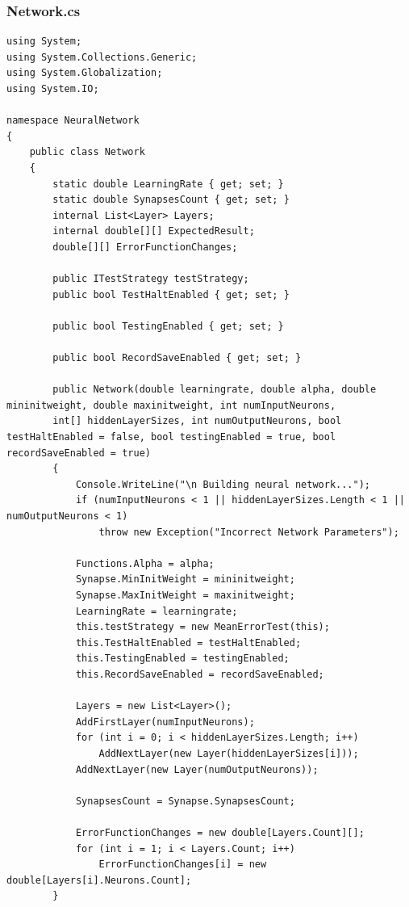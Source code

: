 \documentclass[12pt,a4paper]{article}
\begin{document}
\subsubsection*{Network.cs}
\begin{lstlisting}
using System;
using System.Collections.Generic;
using System.Globalization;
using System.IO;

namespace NeuralNetwork
{
    public class Network
    {
        static double LearningRate { get; set; }
        static double SynapsesCount { get; set; }
        internal List<Layer> Layers;
        internal double[][] ExpectedResult;
        double[][] ErrorFunctionChanges;

        public ITestStrategy testStrategy;
        public bool TestHaltEnabled { get; set; }

        public bool TestingEnabled { get; set; }

        public bool RecordSaveEnabled { get; set; }

        public Network(double learningrate, double alpha, double mininitweight, double maxinitweight, int numInputNeurons,
        int[] hiddenLayerSizes, int numOutputNeurons, bool testHaltEnabled = false, bool testingEnabled = true, bool recordSaveEnabled = true)
        {
            Console.WriteLine("\n Building neural network...");
            if (numInputNeurons < 1 || hiddenLayerSizes.Length < 1 || numOutputNeurons < 1)
                throw new Exception("Incorrect Network Parameters");

            Functions.Alpha = alpha;
            Synapse.MinInitWeight = mininitweight;
            Synapse.MaxInitWeight = maxinitweight;
            LearningRate = learningrate;
            this.testStrategy = new MeanErrorTest(this);
            this.TestHaltEnabled = testHaltEnabled;
            this.TestingEnabled = testingEnabled;
            this.RecordSaveEnabled = recordSaveEnabled;

            Layers = new List<Layer>();
            AddFirstLayer(numInputNeurons);
            for (int i = 0; i < hiddenLayerSizes.Length; i++)
                AddNextLayer(new Layer(hiddenLayerSizes[i]));
            AddNextLayer(new Layer(numOutputNeurons));

            SynapsesCount = Synapse.SynapsesCount;

            ErrorFunctionChanges = new double[Layers.Count][];
            for (int i = 1; i < Layers.Count; i++)
                ErrorFunctionChanges[i] = new double[Layers[i].Neurons.Count];
        }


\end{lstlisting}
\end{document}
